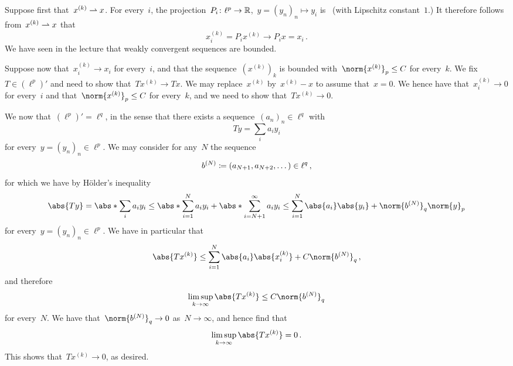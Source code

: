 \section{}





\subsection{}

Suppose first that~$x^{(k)} \rightharpoonup x$.
For every~$i$, the projection~$P_i \colon \ell^p \to \mathbb{R}$,~$y = (y_n)_n \mapsto y_i$ is~{\lipcont} (with Lipschitz constant~$1$.)
It therefore follows from~$x^{(k)} \rightharpoonup x$ that
\[
      x^{(k)}_i
  =   P_i x^{(k)}
  \to P_i x
  =   x_i \,.
\]
We have seen in the lecture that weakly convergent sequences are bounded.

Suppose now that~$x^{(k)}_i \to x_i$ for every~$i$, and that the sequence~$(x^{(k)})_k$ is bounded with~$\norm{x^{(k)}}_p \leq C$ for every~$k$.
We fix~$T \in (\ell^p)'$ and need to show that~$T x^{(k)} \to T x$.
We may replace~$x^{(k)}$ by~$x^{(k)} - x$ to assume that~$x = 0$.
We hence have that~$x^{(k)}_i \to 0$ for every~$i$ and that~$\norm{x^{(k)}}_p \leq C$ for every~$k$, and we need to show that~$T x^{(k)} \to 0$.

We now that~$(\ell^p)' = \ell^q$, in the sense that there exists a sequence~$(a_n)_n \in \ell^q$ with
\[
    T y
  = \sum_i a_i y_i
\]
for every~$y = (y_n)_n \in \ell^p$.
We may consider for any~$N$ the sequence
\[
  b^{(N)}
  \coloneqq
  (a_{N+1}, a_{N+2}, \dotsc)
  \in
  \ell^q \,,
\]
for which we have by Hölder’s inequality
\[
  \abs{Ty}
  =
  \abs*{ \sum_i a_i y_i }
  \leq
  \abs*{ \sum_{i=1}^N a_i y_i }
  +
  \abs*{ \sum_{i=N+1}^\infty a_i y_i }
  \leq
  \sum_{i=1}^N \abs{a_i} \abs{y_i}
  +
  \norm{ b^{(N)} }_q \norm{y}_p
\]
for every~$y = (y_n)_n \in \ell^p$.
We have in particular that
\[
  \abs{ T x^{(k)} }
  \leq
  \sum_{i=1}^N \abs{a_i} \abs{x^{(k)}_i}
  +
  C \norm{b^{(N)}}_q \,,
\]
and therefore
\[
  \limsup_{k \to \infty} \abs{ T x^{(k)} }
  \leq
  C \norm{b^{(N)}}_q
\]
for every~$N$.
We have that~$\norm{b^{(N)}}_q \to 0$ as~$N \to \infty$, and hence find that
\[
  \limsup_{k \to \infty} \abs{ T x^{(k)} }
  =
  0 \,.
\]
This shows that~$T x^{(k)} \to 0$, as desired.





\subsection{}

